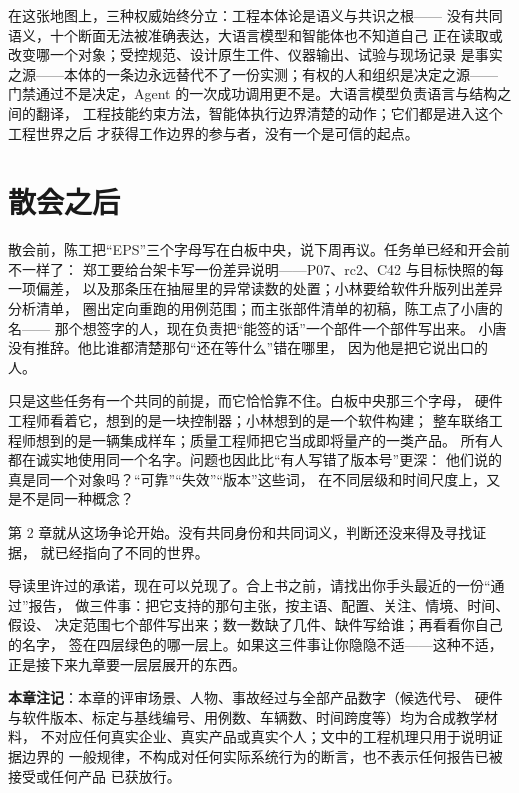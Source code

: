 在这张地图上，三种权威始终分立：工程本体论是语义与共识之根——
没有共同语义，十个断面无法被准确表达，大语言模型和智能体也不知道自己
正在读取或改变哪一个对象；受控规范、设计原生工件、仪器输出、试验与现场记录
是事实之源——本体的一条边永远替代不了一份实测；有权的人和组织是决定之源——
门禁通过不是决定，Agent 的一次成功调用更不是。大语言模型负责语言与结构之间的翻译，
工程技能约束方法，智能体执行边界清楚的动作；它们都是进入这个工程世界之后
才获得工作边界的参与者，没有一个是可信的起点。

\section{散会之后}

散会前，陈工把“EPS”三个字母写在白板中央，说下周再议。任务单已经和开会前不一样了：
郑工要给台架卡写一份差异说明——P07、rc2、C42 与目标快照的每一项偏差，
以及那条压在抽屉里的异常读数的处置；小林要给软件升版列出差异分析清单，
圈出定向重跑的用例范围；而主张部件清单的初稿，陈工点了小唐的名——
那个想签字的人，现在负责把“能签的话”一个部件一个部件写出来。
小唐没有推辞。他比谁都清楚那句“还在等什么”错在哪里，
因为他是把它说出口的人。

只是这些任务有一个共同的前提，而它恰恰靠不住。白板中央那三个字母，
硬件工程师看着它，想到的是一块控制器；小林想到的是一个软件构建；
整车联络工程师想到的是一辆集成样车；质量工程师把它当成即将量产的一类产品。
所有人都在诚实地使用同一个名字。问题也因此比“有人写错了版本号”更深：
他们说的真是同一个对象吗？“可靠”“失效”“版本”这些词，
在不同层级和时间尺度上，又是不是同一种概念？

第 2 章就从这场争论开始。没有共同身份和共同词义，判断还没来得及寻找证据，
就已经指向了不同的世界。

导读里许过的承诺，现在可以兑现了。合上书之前，请找出你手头最近的一份“通过”报告，
做三件事：把它支持的那句主张，按主语、配置、关注、情境、时间、假设、
决定范围七个部件写出来；数一数缺了几件、缺件写给谁；再看看你自己的名字，
签在四层绿色的哪一层上。如果这三件事让你隐隐不适——这种不适，
正是接下来九章要一层层展开的东西。


\begin{noteblock}
\textbf{本章注记}：本章的评审场景、人物、事故经过与全部产品数字（候选代号、
硬件与软件版本、标定与基线编号、用例数、车辆数、时间跨度等）均为合成教学材料，
不对应任何真实企业、真实产品或真实个人；文中的工程机理只用于说明证据边界的
一般规律，不构成对任何实际系统行为的断言，也不表示任何报告已被接受或任何产品
已获放行。
\end{noteblock}
